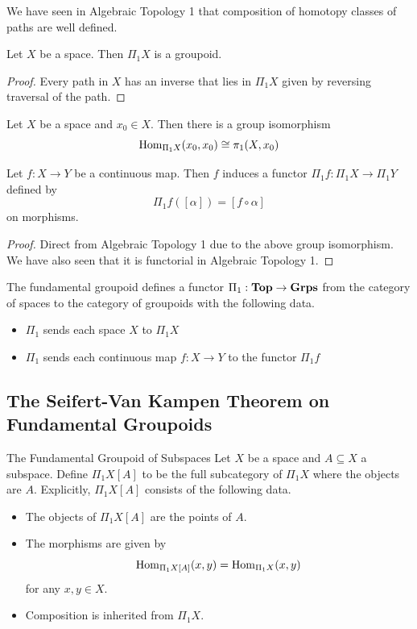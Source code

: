\documentclass[a4paper]{article}
\begin{document}
We have seen in Algebraic Topology 1 that composition of homotopy classes of paths are well defined. 

\begin{lmm}{}{} Let $X$ be a space. Then $\Pi_1X$ is a groupoid. \tcbline
\begin{proof}
Every path in $X$ has an inverse that lies in $\Pi_1X$ given by reversing traversal of the path. 
\end{proof}
\end{lmm}

\begin{lmm}{}{} Let $X$ be a space and $x_0\in X$. Then there is a group isomorphism $$\operatorname{Hom}_{\Pi_1X}(x_0,x_0)\cong\pi_1(X,x_0)$$
\end{lmm}

\begin{prp}{}{} Let $f:X\to Y$ be a continuous map. Then $f$ induces a functor $\Pi_1f:\Pi_1X\to\Pi_1Y$ defined by $$\Pi_1f([\alpha])=[f\circ\alpha]$$ on morphisms. \tcbline
\begin{proof}
Direct from Algebraic Topology 1 due to the above group isomorphism. We have also seen that it is functorial in Algebraic Topology 1. 
\end{proof}
\end{prp}

\begin{thm}{}{} The fundamental groupoid defines a functor $\Pi_1:\bold{Top}\to\bold{Grps}$ from the category of spaces to the category of groupoids with the following data. 
\begin{itemize}
\item $\Pi_1$ sends each space $X$ to $\Pi_1X$
\item $\Pi_1$ sends each continuous map $f:X\to Y$ to the functor $\Pi_1f$
\end{itemize}
\end{thm}

\subsection{The Seifert-Van Kampen Theorem on Fundamental Groupoids}
\begin{defn}{The Fundamental Groupoid of Subspaces}{} Let $X$ be a space and $A\subseteq X$ a subspace. Define $\Pi_1X[A]$ to be the full subcategory of $\Pi_1X$ where the objects are $A$. Explicitly, $\Pi_1X[A]$ consists of the following data. 
\begin{itemize}
\item The objects of $\Pi_1X[A]$ are the points of $A$. 
\item The morphisms are given by $$\operatorname{Hom}_{\Pi_1X[A]}(x,y)=\operatorname{Hom}_{\Pi_1X}(x,y)$$ for any $x,y\in X$. 
\item Composition is inherited from $\Pi_1X$. 
\end{itemize}
\end{defn}
\end{document}
